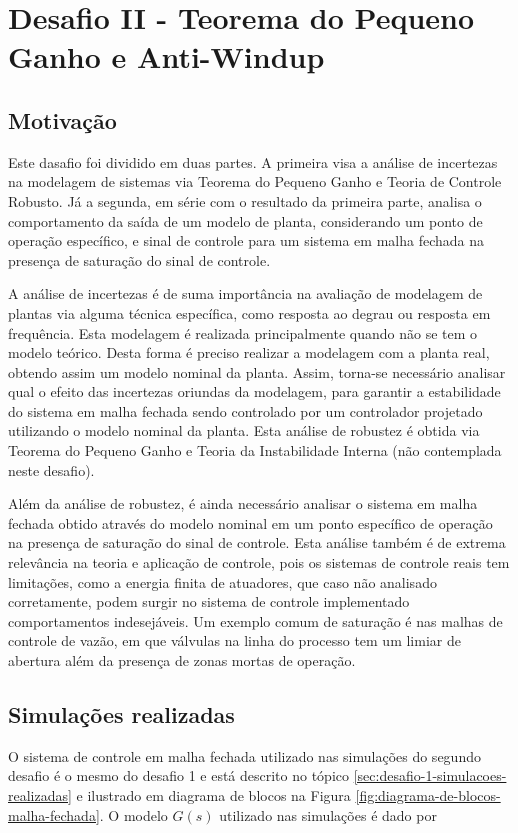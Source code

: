 \section{Desafio II - Teorema do Pequeno Ganho e Anti-Windup} 
 
\subsection{Motivação}
Este dasafio foi dividido em duas partes. A primeira visa a análise de
incertezas na modelagem de sistemas via Teorema do Pequeno Ganho e Teoria de
Controle Robusto. Já a segunda, em série com o resultado da primeira parte,
analisa o comportamento da saída de um modelo de planta, considerando um ponto
de operação específico, e sinal de controle para um sistema em malha fechada na
presença de saturação do sinal de controle.

A análise de incertezas é de suma importância na avaliação de modelagem de
plantas via alguma técnica específica, como resposta ao degrau ou resposta em
frequência. Esta modelagem é realizada principalmente quando não se tem o modelo
teórico. Desta forma é preciso realizar a modelagem com a planta real, obtendo
assim um modelo nominal da planta. Assim, torna-se necessário analisar qual o
efeito das incertezas oriundas da modelagem, para garantir a estabilidade do
sistema em malha fechada sendo controlado por um controlador projetado
utilizando o modelo nominal da planta. Esta análise de robustez é obtida via
Teorema do Pequeno Ganho e Teoria da Instabilidade Interna (não contemplada
neste desafio).

Além da análise de robustez, é ainda necessário analisar o sistema em malha
fechada obtido através do modelo nominal em um ponto específico de operação na
presença de saturação do sinal de controle. Esta análise também é de extrema
relevância na teoria e aplicação de controle, pois os sistemas de controle
reais tem limitações, como a energia finita de atuadores, que caso não analisado
corretamente, podem surgir no sistema de controle implementado comportamentos
indesejáveis. Um exemplo comum de saturação é nas malhas de controle de vazão,
em que válvulas na linha do processo tem um limiar de abertura além da presença
de zonas mortas de operação.

\subsection{Simulações realizadas}
O sistema de controle em malha fechada utilizado nas simulações do segundo
desafio é o mesmo do desafio 1 e está descrito no tópico
\ref{sec:desafio-1-simulacoes-realizadas} e ilustrado em diagrama de blocos na
Figura \ref{fig:diagrama-de-blocos-malha-fechada}. O modelo $G(s)$ utilizado nas
simulações é dado por

